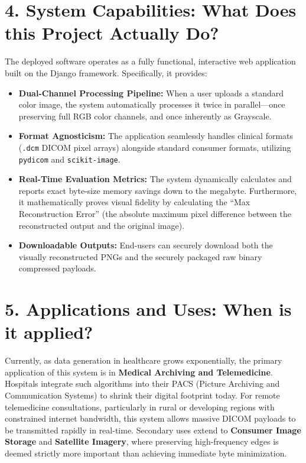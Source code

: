 \documentclass[12pt,a4paper]{article}
\begin{document}
\section*{4. System Capabilities: What Does this Project Actually Do?}
The deployed software operates as a fully functional, interactive web application built on the Django framework. Specifically, it provides:
\begin{itemize}[leftmargin=*]
    \item \textbf{Dual-Channel Processing Pipeline:} When a user uploads a standard color image, the system automatically processes it twice in parallel—once preserving full RGB color channels, and once inherently as Grayscale.
    \item \textbf{Format Agnosticism:} The application seamlessly handles clinical formats (\texttt{.dcm} DICOM pixel arrays) alongside standard consumer formats, utilizing \texttt{pydicom} and \texttt{scikit-image}.
    \item \textbf{Real-Time Evaluation Metrics:} The system dynamically calculates and reports exact byte-size memory savings down to the megabyte. Furthermore, it mathematically proves visual fidelity by calculating the ``Max Reconstruction Error'' (the absolute maximum pixel difference between the reconstructed output and the original image).
    \item \textbf{Downloadable Outputs:} End-users can securely download both the visually reconstructed PNGs and the securely packaged raw binary compressed payloads.
\end{itemize}

\section*{5. Applications and Uses: When is it applied?}
Currently, as data generation in healthcare grows exponentially, the primary application of this system is in \textbf{Medical Archiving and Telemedicine}. Hospitals integrate such algorithms into their PACS (Picture Archiving and Communication Systems) to shrink their digital footprint today. For remote telemedicine consultations, particularly in rural or developing regions with constrained internet bandwidth, this system allows massive DICOM payloads to be transmitted rapidly in real-time. Secondary uses extend to \textbf{Consumer Image Storage} and \textbf{Satellite Imagery}, where preserving high-frequency edges is deemed strictly more important than achieving immediate byte minimization.
\end{document}
